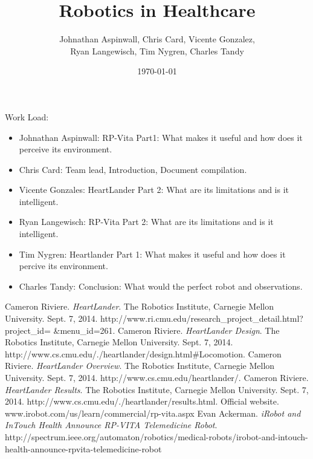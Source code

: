 \documentclass[12pt,conference]{IEEEtran}
\title{Robotics in Healthcare}
\date{\today}
\author{Johnathan Aspinwall, Chris Card, Vicente Gonzalez, \\
Ryan Langewisch, Tim Nygren, Charles Tandy}
\begin{document}
\maketitle
\thispagestyle{plain}
\pagestyle{plain}






\appendix
Work Load:
\begin{itemize}
\item Johnathan Aspinwall: RP-Vita Part1: What makes it useful and how does it perceive its environment.
\item Chris Card: Team lead, Introduction, Document compilation.
\item Vicente Gonzales: HeartLander Part 2: What are its limitations and is it intelligent.
\item Ryan Langewisch: RP-Vita Part 2: What are its limitations and is it intelligent. 
\item Tim Nygren: Heartlander Part 1: What makes it useful and how does it percive its environment.
\item Charles Tandy: Conclusion: What would the perfect robot and observations.
\end{itemize}

\begin{thebibliography}{4}
  Cameron Riviere. {\em HeartLander}. The Robotics Institute, Carnegie Mellon University. Sept. 7, 2014. http://www.ri.cmu.edu/research\_project\_detail.html?project\_id=
\&menu\_id=261.
  Cameron Riviere. {\em HeartLander Design}. The Robotics Institute, Carnegie Mellon University. Sept. 7, 2014. http://www.cs.cmu.edu/\texttildelow{}./heartlander/design.html\#Locomotion.
  Cameron Riviere. {\em HeartLander Overview}. The Robotics Institute, Carnegie Mellon University. Sept. 7, 2014. http://www.cs.cmu.edu/\texttildelow{}heartlander/.
  Cameron Riviere. {\em HeartLander Results}. The Robotics Institute, Carnegie Mellon University. Sept. 7, 2014. http://www.cs.cmu.edu/\texttildelow{}./heartlander/results.html.
 Official website.  www.irobot.com/us/learn/commercial/rp-vita.aspx
 Evan Ackerman. {\em iRobot and InTouch Health Announce RP-VITA Telemedicine Robot}. http://spectrum.ieee.org/automaton/robotics/medical-robots/irobot-and-intouch-health-announce-rpvita-telemedicine-robot
\end{thebibliography}
\end{document}
